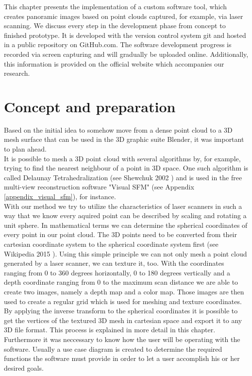 This chapter presents the implementation of a custom software tool, which creates panoramic images based on point clouds captured, for example, via laser scanning. We discuss every step in the development phase from concept to finished prototype. It is developed with the version control system git and hosted in a public repository on GitHub.com. The software development progress is recorded via screen capturing and will gradually be uploaded online. Additionally, this information is provided on the official website which accompanies our research.

\section{Concept and preparation}

Based on the initial idea to somehow move from a dense point cloud to a 3D mesh surface that can be used in the 3D graphic suite Blender, it was important to plan ahead.\\
It is possible to mesh a 3D point cloud with several algorithms by, for example, trying to find the nearest neighbour of a point in 3D space. One such algorithm is called Delaunay Tetrahedralization  (see Shewchuk 2002 \parencite{Shewchuk02constraineddelaunay}) and is used in the free multi-view reconstruction software "Visual SFM" (see Appendix \ref{appendix_visual_sfm}), for instance.\\
With our method we try to utilize the characteristics of laser scanners in such a way that we know every aquired point can be described by scaling and rotating a unit sphere. In mathematical terms we can determine the spherical coordinates of every point in our point cloud. The 3D points need to be converted from their cartesian coordinate system to the spherical coordinate system first (see Wikipedia 2015 \parencite{wiki:CoordinateSystem}). Using this simple principle we can not only mesh a point cloud generated by a laser scanner, we can texture it, too. With the coordinates ranging from 0 to 360 degrees horizontally, 0 to 180 degrees vertically and a depth coordinate ranging from 0 to the maximum scan distance we are able to create two images, namely a depth map and a color map. Those images are then used to create a regular grid which is used for meshing and texture coordinates. By applying the inverse transform to the spherical coordinates it is possible to get the vertices of the textured 3D mesh in cartesian space and export it to any 3D file format. This process is explained in more detail in this chapter.\\
Furthermore it was neccessary to know how the user will be operating with the software. Usually a use case diagram is created to determine the required functions the software must provide in order to let a user accomplish his or her desired goals.


